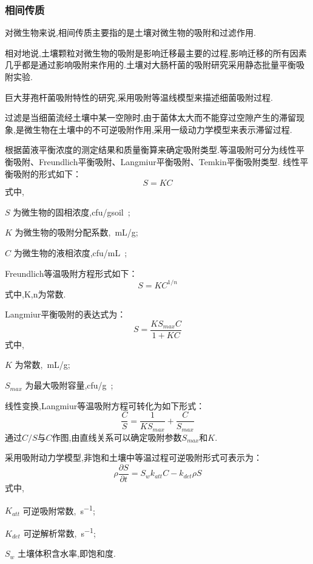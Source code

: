 \subsubsection{相间传质}
对微生物来说,相间传质主要指的是土壤对微生物的吸附和过滤作用.\par
相对地说,土壤颗粒对微生物的吸附是影响迁移最主要的过程,影响迁移的所有因素几乎都是通过影响吸附来作用的.土壤对大肠杆菌的吸附研究采用静态批量平衡吸附实验.\par
巨大芽孢杆菌吸附特性的研究,采用吸附等温线模型来描述细菌吸附过程.\par
过滤是当细菌流经土壤中某一空隙时,由于菌体太大而不能穿过空隙产生的滞留现象,是微生物在土壤中的不可逆吸附作用,采用一级动力学模型来表示滞留过程.\par
根据菌液平衡浓度的测定结果和质量衡算来确定吸附类型.等温吸附可分为线性平衡吸附、Freundlich平衡吸附、Langmiur平衡吸附、Temkin平衡吸附类型.
线性平衡吸附的形式如下：
\begin{equation}
S=KC
\end{equation}
式中,
\begin{paralist}
	\item[$S$]为微生物的固相浓度,\SI{cfu/gsoil};
	\item[$K$]为微生物的吸附分配系数,\SI{}{mL/g};
	\item[$C$]为微生物的液相浓度,\SI{cfu/mL};
\end{paralist}
Freundlich等温吸附方程形式如下：
\begin{equation}
S=KC^{1/n}
\end{equation}
式中,K,n为常数.\par
Langmiur平衡吸附的表达式为：
\begin{equation}
S=\dfrac{KS_{max}C}{1+KC}
\end{equation}
式中,
\begin{paralist}
	\item[$K$]为常数,\SI{}{mL/g};
	\item[$S_{max}$]为最大吸附容量,\SI{cfu/g};
\end{paralist}
线性变换,Langmiur等温吸附方程可转化为如下形式：
\begin{equation}
\dfrac{C}{S}=\dfrac{1}{KS_{max}}+\dfrac{C}{S_{max}}
\end{equation}
通过$C/S$与$C$作图,由直线关系可以确定吸附参数$S_{max}$和$K$.\par
采用吸附动力学模型,非饱和土壤中等温过程可逆吸附形式可表示为：
\begin{equation}
\rho\dfrac{\partial S}{\partial t}=S_wk_{att}C-k_{det}\rho S
\end{equation}
式中,
\begin{paralist}
	\item[$K_{att}$]可逆吸附常数,\SI{}{s^{-1}};
	\item[$K_{det}$]可逆解析常数,\SI{}{s^{-1}};
	\item[$S_w$]土壤体积含水率,即饱和度.
\end{paralist}
